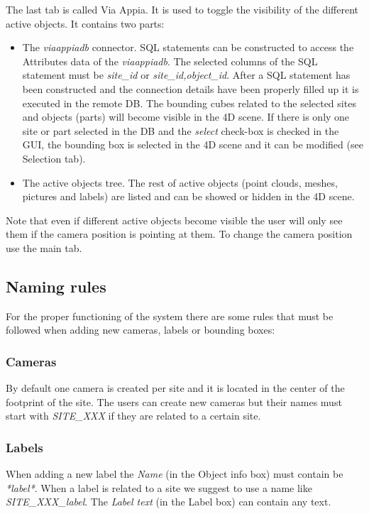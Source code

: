 \documentclass[a4paper,11pt]{article}
\begin{document}
The last tab is called Via Appia. It is used to toggle the visibility of the different active objects. It contains two parts: 
\begin{itemize}
	\item The \textit{viaappiadb} connector. SQL statements can be constructed to access the Attributes data of the \textit{viaappiadb}. The selected columns of the SQL statement must be \textit{site\_id} or \textit{site\_id,object\_id}. After a SQL statement has been constructed and the connection details have been properly filled up it is executed in the remote DB. The bounding cubes related to the selected sites and objects (parts) will become visible in the 4D scene. If there is only one site or part selected in the DB and the \textit{select} check-box is checked in the GUI, the bounding box is selected in the 4D scene and it can be modified (see Selection tab).
	\item The active objects tree. The rest of active objects (point clouds, meshes, pictures and labels) are listed and can be showed or hidden in the 4D scene.
\end{itemize}

Note that even if different active objects become visible the user will only see them if the camera position is pointing at them. To change the camera position use the main tab.

\subsection{Naming rules}
\label{sec:guiname}

For the proper functioning of the system there are some rules that must be followed when adding new cameras, labels or bounding boxes:

\subsubsection{Cameras}

By default one camera is created per site and it is located in the center of the footprint of the site. The users can create new cameras but their names must start with \textit{SITE\_XXX} if they are related to a certain site.

\subsubsection{Labels}
 
When adding a new label the \textit{Name} (in the Object info box) must contain be \textit{*label*}. When a label is related to a site we suggest to use a name like \textit{SITE\_XXX\_label}. The \textit{Label text} (in the Label box) can contain any text.
\end{document}
